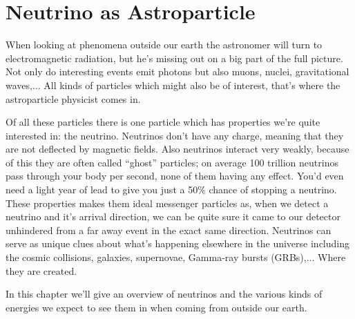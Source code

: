 \chapter{Neutrino as Astroparticle}
When looking at phenomena outside our earth the astronomer will turn to
electromagnetic radiation, but he's missing out on a big part of the full
picture. Not only do interesting events emit photons but also muons, nuclei,
gravitational waves,... All kinds of particles which might also be of interest,
that's where the astroparticle physicist comes in.

Of all these particles there is one particle which has properties we're quite
interested in: the neutrino.  Neutrinos don't have any charge, meaning that
they are not deflected by magnetic fields. Also neutrinos interact very weakly,
because of this they are often called “ghost” particles; on average 100
trillion neutrinos pass through your body per second, none of them having any
effect.  You'd even need a light year of lead to give you just a 50\% chance of
stopping a neutrino.
These properties makes them ideal messenger particles as, when we detect a neutrino
and it's arrival direction, we can be quite sure it came to our detector unhindered
from a far away event in the exact same direction.
Neutrinos can serve as unique clues
about what’s happening elsewhere in the universe including the cosmic
collisions, galaxies, supernovae, Gamma-ray bursts (GRBs),... Where they are created.

In this chapter we'll give an overview of neutrinos and the various kinds of energies we expect
to see them in when coming from outside our earth.

